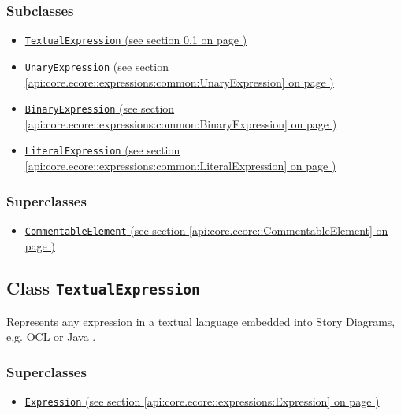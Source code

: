 \subsubsection*{Subclasses}
\begin{itemize}
\item \hyperref[api:core.ecore::expressions:TextualExpression]{\texttt{TextualExpression} (see section \ref*{api:core.ecore::expressions:TextualExpression} on page \pageref*{api:core.ecore::expressions:TextualExpression})}
\item \hyperref[api:core.ecore::expressions:common:UnaryExpression]{\texttt{UnaryExpression} (see section \ref*{api:core.ecore::expressions:common:UnaryExpression} on page \pageref*{api:core.ecore::expressions:common:UnaryExpression})}
\item \hyperref[api:core.ecore::expressions:common:BinaryExpression]{\texttt{BinaryExpression} (see section \ref*{api:core.ecore::expressions:common:BinaryExpression} on page \pageref*{api:core.ecore::expressions:common:BinaryExpression})}
\item \hyperref[api:core.ecore::expressions:common:LiteralExpression]{\texttt{LiteralExpression} (see section \ref*{api:core.ecore::expressions:common:LiteralExpression} on page \pageref*{api:core.ecore::expressions:common:LiteralExpression})}
\end{itemize}
\subsubsection*{Superclasses}
\begin{itemize}
\item \hyperref[api:core.ecore::CommentableElement]{\texttt{CommentableElement} (see section \ref*{api:core.ecore::CommentableElement} on page \pageref*{api:core.ecore::CommentableElement})}
\end{itemize}
\subsection{Class \texttt{TextualExpression}}
\label{api:core.ecore::expressions:TextualExpression}
Represents any expression in a textual language embedded into Story Diagrams, e.g. OCL or Java .
\subsubsection*{Superclasses}
\begin{itemize}
\item \hyperref[api:core.ecore::expressions:Expression]{\texttt{Expression} (see section \ref*{api:core.ecore::expressions:Expression} on page \pageref*{api:core.ecore::expressions:Expression})}
\end{itemize}
